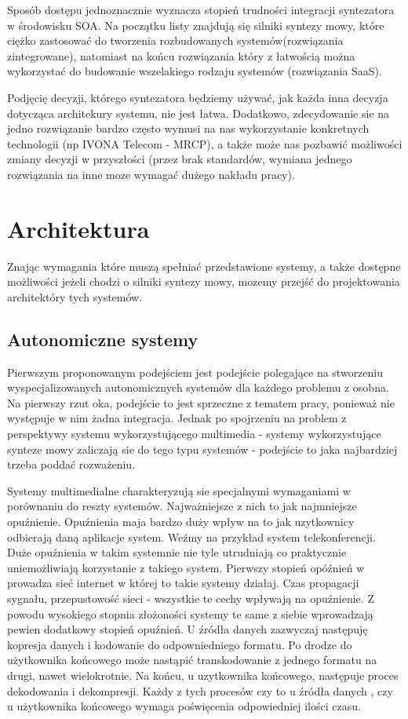 Sposób dostępu jednoznacznie wyznacza stopień trudności integracji syntezatora w środowisku SOA. Na początku listy znajdują się silniki syntezy mowy, które ciężko zastosować do tworzenia rozbudowanych systemów(rozwiązania zintegrowane), natomiast na końcu rozwiązania który z łatwością można wykorzystać do budowanie wszelakiego rodzaju systemów (rozwiązania SaaS).

Podjęcię decyzji, którego syntezatora będziemy używać, jak każda inna decyzja dotycząca architekury systemu, nie jest łatwa. Dodatkowo, zdecydowanie sie na jedno rozwiązanie bardzo często wymusi na nas wykorzystanie konkretnych technologii (np IVONA Telecom - MRCP), a także może nas pozbawić możliwości zmiany decyzji w przyszłości (przez brak standardów, wymiana jednego rozwiązania na inne moze wymagać dużego nakładu pracy).

\section {Architektura}

Znając wymagania które muszą spełniać przedstawione systemy, a także dostępne możliwości jeżeli chodzi o silniki syntezy mowy,  mozemy przejść do projektowania architektóry tych systemów.

\subsection {Autonomiczne systemy}
Pierwszym proponowanym podejściem jest podejście polegające na stworzeniu wyspecjalizowanych autonomicznych systemów dla każdego problemu z osobna. Na pierwszy rzut oka, podejście to jest sprzeczne z tematem pracy, ponieważ nie występuje w nim żadna integracja. Jednak po spojrzeniu na problem z perspektywy systemu wykorzystującego multimedia - systemy wykorzystujące synteze mowy zaliczają sie do tego typu systemów - podejście to jaka najbardziej trzeba poddać rozważeniu.

Systemy multimedialne charakteryzują sie specjalnymi wymaganiami w porównaniu do reszty systemów. Najważniejsze z nich to jak najmniejsze opuźnienie. Opuźnienia maja bardzo duży wpływ na to jak uzytkownicy odbierają daną aplikacje system. Weźmy na przykład system telekonferencji. Duże opuźnienia w takim systemnie nie tyle utrudniają co praktycznie uniemożliwiają korzystanie z takiego system. Pierwszy stopień opóźnień w prowadza sieć internet w której to takie systemy działaj. Czas propagacji sygnału, przepustowość sieci - wszystkie te cechy wpływają na opuźnienie. Z powodu wysokiego stopnia złożoności systemy te same z siebie wprowadzają pewien dodatkowy stopień opuźnień. U źródła danych zazwyczaj następuję kopresja danych i kodowanie do odpowniedniego formatu. Po drodze do użytkownika końcowego może nastąpić transkodowanie z jednego formatu na drugi, nawet wielokrotnie. Na końcu, u uzytkownika końcowego, następuje proces dekodowania i dekompresji. Każdy z tych procesów czy to u źródła danych , czy u użytkownika końcowego wymaga poświęcenia odpowiedniej ilości czasu. 

